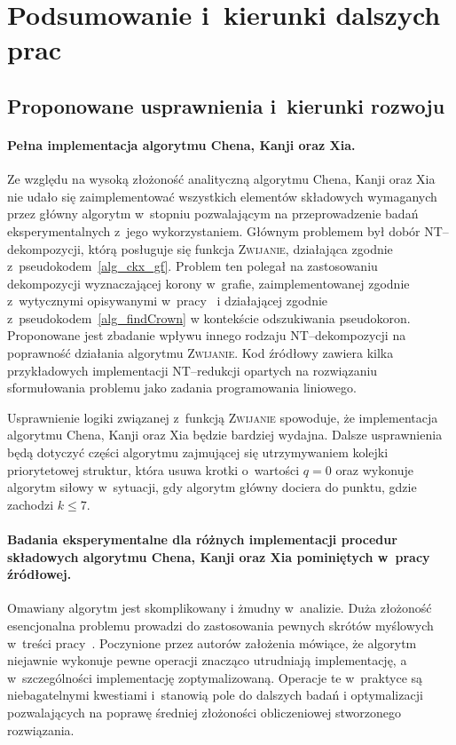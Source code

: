 \chapter{Podsumowanie i~kierunki dalszych prac}
\label{summary}
\section*{Proponowane usprawnienia i~kierunki rozwoju}\label{s_improvements}
\addtocounter{section}{1}
  \subsubsection{\textbf{Pełna implementacja algorytmu Chena, Kanji oraz Xia.}}\label{sss_problems_ckx}

  Ze względu na wysoką złożoność analityczną algorytmu Chena, Kanji oraz Xia nie udało się zaimplementować wszystkich elementów składowych wymaganych przez główny algorytm w~stopniu pozwalającym na przeprowadzenie badań eksperymentalnych z~jego wykorzystaniem.
  Głównym problemem był dobór NT--dekompozycji, którą posługuje się funkcja \textsc{Zwijanie}, działająca zgodnie z~pseudokodem~\ref{alg_ckx_gf}.
  Problem ten polegał na zastosowaniu dekompozycji wyznaczającej korony w~grafie, zaimplementowanej zgodnie z~wytycznymi opisywanymi w~pracy~\cite{KernelizationAlgorithms04} i działającej zgodnie z~pseudokodem~\ref{alg_findCrown} w kontekście odszukiwania pseudokoron.
  Proponowane jest zbadanie wpływu innego rodzaju NT--dekompozycji na poprawność działania algorytmu \textsc{Zwijanie}.
  Kod źródłowy zawiera kilka przykładowych implementacji NT--redukcji opartych na rozwiązaniu sformułowania problemu jako zadania programowania liniowego.

  Usprawnienie logiki związanej z~funkcją \textsc{Zwijanie} spowoduje, że implementacja algorytmu Chena, Kanji oraz Xia będzie bardziej wydajna.
  Dalsze usprawnienia będą dotyczyć części algorytmu zajmującej się utrzymywaniem kolejki priorytetowej struktur, która usuwa krotki o~wartości $q = 0$ oraz wykonuje algorytm siłowy w~sytuacji, gdy algorytm główny dociera do punktu, gdzie zachodzi $k \leq 7$.

  \subsubsection{\textbf{Badania eksperymentalne dla różnych implementacji procedur składowych algorytmu Chena, Kanji oraz Xia pominiętych w~pracy źródłowej.}}

  Omawiany algorytm jest skomplikowany i żmudny w~analizie.
  Duża złożoność esencjonalna problemu prowadzi do zastosowania pewnych skrótów myślowych w~treści pracy~\cite{ImprovedBounds10}.
  Poczynione przez autorów założenia mówiące, że algorytm niejawnie wykonuje pewne operacji znacząco utrudniają implementację, a w~szczególności implementację zoptymalizowaną.
  Operacje te w~praktyce są niebagatelnymi kwestiami i~stanowią pole do dalszych badań i optymalizacji pozwalających na poprawę średniej złożoności obliczeniowej stworzonego rozwiązania.

